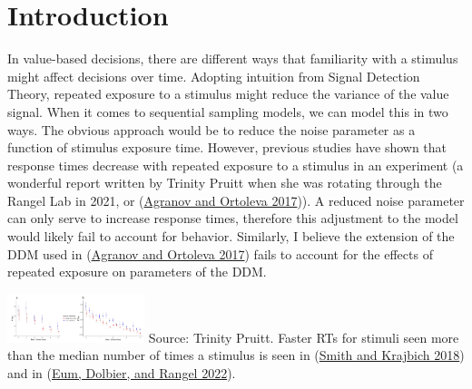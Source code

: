 \documentclass[
]{book}
\begin{document}
\hypertarget{introduction}{%
\section{Introduction}\label{introduction}}

In value-based decisions, there are different ways that familiarity with a stimulus might affect decisions over time. Adopting intuition from Signal Detection Theory, repeated exposure to a stimulus might reduce the variance of the value signal. When it comes to sequential sampling models, we can model this in two ways. The obvious approach would be to reduce the noise parameter as a function of stimulus exposure time. However, previous studies have shown that response times decrease with repeated exposure to a stimulus in an experiment (a wonderful report written by Trinity Pruitt when she was rotating through the Rangel Lab in 2021, or (\protect\hyperlink{ref-agranov2017}{Agranov and Ortoleva 2017})). A reduced noise parameter can only serve to increase response times, therefore this adjustment to the model would likely fail to account for behavior. Similarly, I believe the extension of the DDM used in (\protect\hyperlink{ref-agranov2017}{Agranov and Ortoleva 2017}) fails to account for the effects of repeated exposure on parameters of the DDM.

\includegraphics[width=0.3\textwidth,height=\textheight]{images/mem-aDDM-fasterRTs.PNG}
Source: Trinity Pruitt. Faster RTs for stimuli seen more than the median number of times a stimulus is seen in (\protect\hyperlink{ref-smith2018}{Smith and Krajbich 2018}) and in (\protect\hyperlink{ref-eum2022}{Eum, Dolbier, and Rangel 2022}).\\
\end{document}

